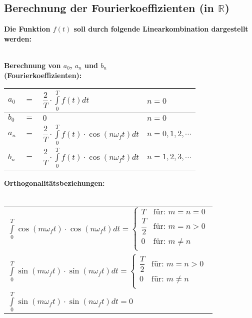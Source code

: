 	\subsection{Berechnung der Fourierkoeffizienten (in $\mathbb{R}$)}
		\textbf{Die Funktion $f(t)$ soll durch folgende Linearkombination dargestellt werden:}\\[3pt]
		\\[3pt]
		\begin{minipage}[t]{0.5\textwidth}
			\textbf{Berechnung von $a_0$, $a_n$ und $b_n$\\[1pt] (Fourierkoeffizienten):}\\[3pt]
			\begin{tabular}{|lll|l|}
				\hline
				$\displaystyle a_0$ & $=$ & $\displaystyle \dfrac{2}{T} \cdot \int\limits_{0}^{T} f(t) dt$ & $\displaystyle n = 0$\\[0.2pt]
				\hline
				$\displaystyle b_0$ & $\displaystyle =$ & $\displaystyle 0$ & $\displaystyle n = 0$\\
				\hline
				$\displaystyle a_n$ & $\displaystyle =$ & $\displaystyle \dfrac{2}{T} \cdot \int\limits_{0}^{T} f(t) \cdot \cos(n \omega_f t) dt$ & $\displaystyle n = 0, 1, 2, \cdots$\\
				\hline
				$\displaystyle b_n$ & $\displaystyle =$ & $\displaystyle \dfrac{2}{T} \cdot \int\limits_{0}^{T} f(t) \cdot \cos(n \omega_f t) dt$ & $\displaystyle n = 1, 2, 3, \cdots$\\
				\hline
			\end{tabular}
		\end{minipage}
		\begin{minipage}[t]{0.5\textwidth}
			\textbf{Orthogonalitätsbeziehungen:\\[1pt]}\\[3pt]
			\begin{tabular}{|l|}
				\hline
				$\displaystyle \int\limits_{0}^{T} \cos(m \omega_f t) \cdot \cos(n \omega_f t) dt = \left\lbrace 
					\begin{array}{ll}
						T & \text{für: } m = n = 0\\
						\dfrac{T}{2} & \text{für: } m = n > 0\\
						0 & \text{für: } m \neq n\\
					\end{array} \right.$\\[3pt]
				$\displaystyle \int\limits_{0}^{T} \sin(m \omega_f t) \cdot \sin(n \omega_f t) dt = \left\lbrace 
					\begin{array}{ll}
						\dfrac{T}{2} & \text{für: } m = n > 0\\
						0 & \text{für: } m \neq n\\
					\end{array} \right.$\\[3pt]
				$\displaystyle \int\limits_{0}^{T} \sin(m \omega_f t) \cdot \sin(n \omega_f t) dt = 0$\\[3pt]
				\hline
			\end{tabular}
		\end{minipage}
	
